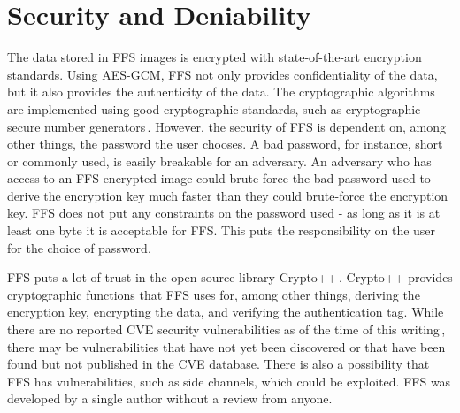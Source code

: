\section{Security and Deniability}
\label{sec:dis_sec}
The data stored in \gls{FFS} images is encrypted with \mbox{state-of-the-art} encryption standards. Using \gls{AES}-\gls{GCM}, \gls{FFS} not only provides confidentiality of the data, but it also provides the authenticity of the data. The cryptographic algorithms are implemented using good cryptographic standards, such as cryptographic secure number generators\,\cite{RandomNumberGeneratorCryptoWiki2021}. However, the security of \gls{FFS} is dependent on, among other things, the password the user chooses. A bad password, for instance, short or commonly used, is easily breakable for an adversary. An adversary who has access to an \gls{FFS} encrypted image could \mbox{brute-force} the bad password used to derive the encryption key much faster than they could \mbox{brute-force} the encryption key. \gls{FFS} does not put any constraints on the password used - as long as it is at least one byte it is acceptable for \gls{FFS}. This puts the responsibility on the user for the choice of password. 

\gls{FFS} puts a lot of trust in the \mbox{open-source} library Crypto++\,\cite{CryptoLibraryFree}. Crypto++ provides cryptographic functions that \gls{FFS} uses for, among other things, deriving the encryption key, encrypting the data, and verifying the authentication tag. While there are no reported CVE security vulnerabilities as of the time of this writing\,\cite{CryptoppSecurityVulnerabilities}, there may be vulnerabilities that have not yet been discovered or that have been found but not published in the CVE database. There is also a possibility that \gls{FFS} has vulnerabilities, such as side channels, which could be exploited. \gls{FFS} was developed by a single author without a review from anyone.

